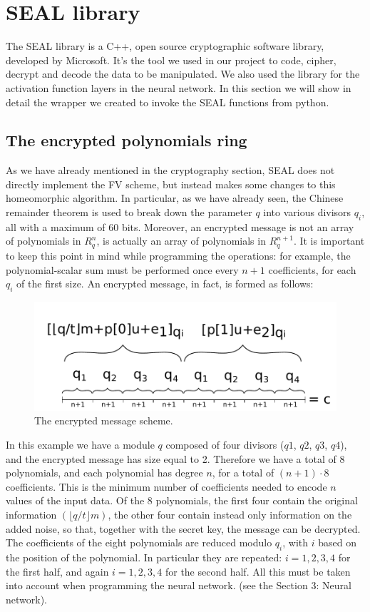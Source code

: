 \section{SEAL library}

The SEAL library is a C++, open source cryptographic software library, developed by Microsoft. It's the tool we used in our project to code, cipher, decrypt and decode the data to be manipulated. We also used the library for the activation function layers in the neural network. In this section we will show in detail the wrapper we created to invoke the SEAL functions from python.

\subsection{The encrypted polynomials ring}

As we have already mentioned in the cryptography section, SEAL does not directly implement the FV scheme, but instead makes some changes to this homeomorphic algorithm. In particular, as we have already seen, the Chinese remainder theorem is used to break down the parameter $q$ into various divisors $q_i$, all with a maximum of 60 bits. Moreover, an encrypted message is not an array of polynomials in $R^n_q$, is actually an array of polynomials in $R^{n+1}_q$. It is important to keep this point in mind while programming the operations: for example, the polynomial-scalar sum must be performed once every $n+1$ coefficients, for each $q_i$ of the first size. An encrypted message, in fact, is formed as follows:

\begin{figure}[H]
	\centering
	\includegraphics[width=\textwidth]{images/fig3.pdf}
    \caption{The encrypted message scheme.}
    \label{fig:im3}
\end{figure}

In this example we have a module $q$ composed of four divisors ($q1$, $q2$, $q3$, $q4$), and the encrypted message has size equal to 2. Therefore we have a total of 8 polynomials, and each polynomial has degree $n$, for a total of $(n+1)\cdot8$ coefficients. This is the minimum number of coefficients needed to encode $n$ values of the input data. Of the 8 polynomials, the first four contain the original information $(\lfloor q/t \rfloor m)$, the other four contain instead only information on the added noise, so that, together with the secret key, the message can be decrypted. The coefficients of the eight polynomials are reduced modulo $q_i$, with $i$ based on the position of the polynomial. In particular they are repeated: $i = 1,2,3,4$ for the first half, and again $i = 1,2,3,4$ for the second half. All this must be taken into account when programming the neural network. (see the Section 3: Neural network).

